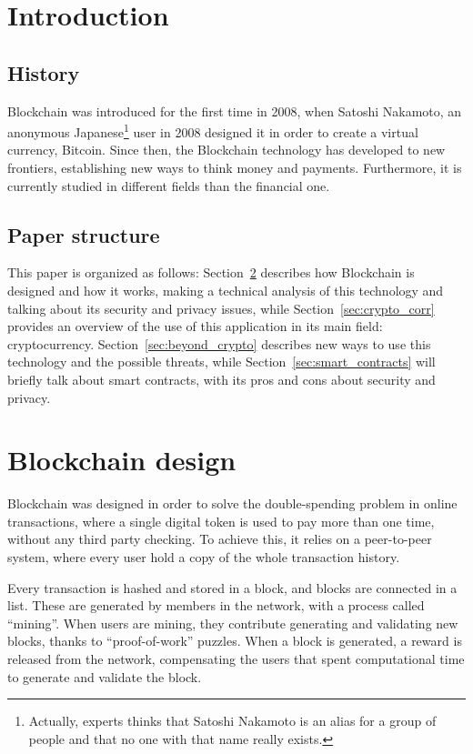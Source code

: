 \section{Introduction}

\subsection{History}
Blockchain was introduced for the first time in 2008, when Satoshi
Nakamoto, an anonymous Japanese\footnote{Actually, experts thinks that Satoshi
Nakamoto is an alias for a group of people and that no one with that name
really exists.} user in 2008 designed it in order to create a virtual currency,
Bitcoin. Since then, the Blockchain technology has developed to new frontiers,
establishing new ways to think money and payments. Furthermore, it is currently
studied in different fields than the financial one.

\subsection{Paper structure}

This paper is organized as follows: Section~\ref{sec:block_design} describes
how Blockchain is designed and how it works, making a technical analysis of this
technology and talking about its security and privacy issues, while
Section~\ref{sec:crypto_corr} provides an overview of the
use of this application in its main field: cryptocurrency.
Section~\ref{sec:beyond_crypto} describes new ways to use this technology and
the possible threats, while Section~\ref{sec:smart_contracts} will briefly talk
about smart contracts, with its pros and cons about security and privacy.

\section{Blockchain design}
\label{sec:block_design}
Blockchain was designed in order to solve the double-spending problem in
online transactions, where a single digital token is used to pay more than one
time, without any third party checking\cite{nakamoto08}. To achieve this, it
relies on a peer-to-peer system, where every user hold a copy of the whole
transaction history.

Every transaction is hashed and stored in a block, and blocks are connected in
a list. These are generated by members in the network, with a process called
``mining''. When users are mining, they contribute generating and validating
new blocks, thanks to ``proof-of-work'' puzzles. When a block is
generated, a reward is released from the network, compensating the users that
spent computational time to generate and validate the block.

